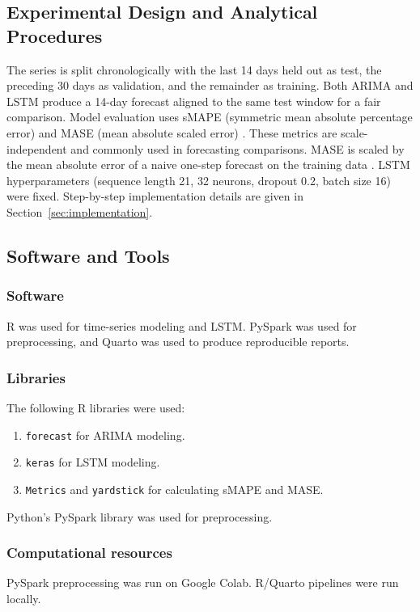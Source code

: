 \documentclass[12pt, a4paper]{article}
\begin{document}
\subsection{Experimental Design and Analytical Procedures}

The series is split chronologically with the last 14 days held out as test, the preceding 30 days as validation, and the remainder as training. Both ARIMA and LSTM produce a 14-day forecast aligned to the same test window for a fair comparison. Model evaluation uses sMAPE (symmetric mean absolute percentage error) and MASE (mean absolute scaled error) \cite{hyndman2006,prabhat2024}. These metrics are scale-independent and commonly used in forecasting comparisons. MASE is scaled by the mean absolute error of a naive one-step forecast on the training data \cite{hyndman2006}. LSTM hyperparameters (sequence length 21, 32 neurons, dropout 0.2, batch size 16) were fixed. Step-by-step implementation details are given in Section~\ref{sec:implementation}.

\subsection{Software and Tools}

\subsubsection{Software} 
R was used for time-series modeling and LSTM. PySpark was used for preprocessing, and Quarto was used to produce reproducible reports. 

\subsubsection{Libraries} 
The following R libraries were used:

\begin{enumerate}
    \item \texttt{forecast} for ARIMA modeling.
    \item \texttt{keras} for LSTM modeling.
    \item \texttt{Metrics} and \texttt{yardstick} for calculating sMAPE and MASE.
\end{enumerate}

Python's PySpark library was used for preprocessing.

\subsubsection{Computational resources} PySpark preprocessing was run on Google Colab. R/Quarto pipelines were run locally.
\end{document}
